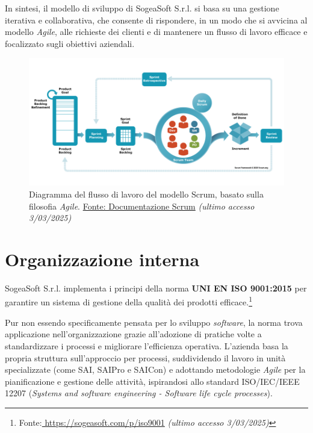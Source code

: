    \noindent In sintesi, il modello di sviluppo di SogeaSoft S.r.l. si basa su una gestione iterativa e collaborativa, che consente di rispondere, in un modo che si avvicina al modello \textit{Agile}, alle richieste dei clienti e di mantenere un flusso di lavoro efficace e focalizzato sugli obiettivi aziendali.

    \begin{figure}[H]
        \centering
        \includegraphics[width=0.8\linewidth]{BCS-Tessi/images/scrum_flow.png}
        \caption[Diagramma del modello Scrum]{Diagramma del flusso di lavoro del modello Scrum, basato sulla filosofia \textit{Agile}. \href{https://www.scrum.org/learning-series/what-is-scrum/}{Fonte: Documentazione Scrum} \textit{(ultimo accesso 3/03/2025)}}
        \label{fig:scrum_flow}
    \end{figure}
    
    \section{Organizzazione interna}
    SogeaSoft S.r.l. implementa i principi della norma \textbf{UNI EN ISO 9001:2015} per garantire un sistema di gestione della qualità dei prodotti efficace.\footnote{Fonte:\href{https://sogeasoft.com/p/iso9001}{ https://sogeasoft.com/p/iso9001} \textit{(ultimo accesso 3/03/2025)}}
    
    \vspace{0.2 em}
    \noindent Pur non essendo specificamente pensata per lo sviluppo \textit{software}, la norma trova applicazione nell’organizzazione grazie all’adozione di pratiche volte a standardizzare i processi e migliorare l’efficienza operativa. L'azienda basa la propria struttura sull'approccio per processi, suddividendo il lavoro in unità specializzate (come SAI, SAIPro e SAICon) e adottando metodologie \textit{Agile} per la pianificazione e gestione delle attività, ispirandosi allo standard ISO/IEC/IEEE 12207 (\textit{Systems and software engineering - Software life cycle processes}).

